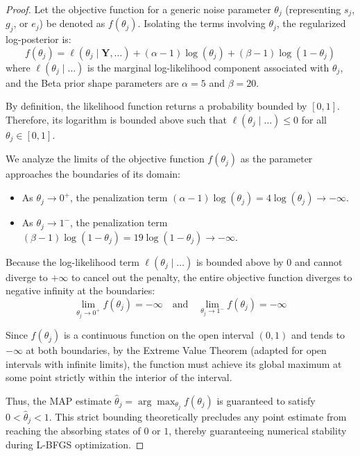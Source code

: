 \documentclass[11pt,a4paper]{article}
\begin{document}
\begin{proof}
Let the objective function for a generic noise parameter $\theta_j$ 
(representing $s_j$, $g_j$, or $e_j$) be denoted as $f(\theta_j)$. 
Isolating the terms involving $\theta_j$, the regularized log-posterior is:
\begin{equation}
    f(\theta_j) = \ell(\theta_j \mid \mathbf{Y}, \dots) 
    + (\alpha - 1)\log(\theta_j) + (\beta - 1)\log(1 - \theta_j)
\end{equation}
where $\ell(\theta_j \mid \dots)$ is the marginal log-likelihood component 
associated with $\theta_j$, and the Beta prior shape parameters are 
$\alpha = 5$ and $\beta = 20$.

By definition, the likelihood function returns a probability bounded by $[0, 1]$. 
Therefore, its logarithm is bounded above such that 
$\ell(\theta_j \mid \dots) \le 0$ for all $\theta_j \in [0, 1]$.

We analyze the limits of the objective function $f(\theta_j)$ 
as the parameter approaches the boundaries of its domain:
\begin{itemize}
    \item As $\theta_j \to 0^+$, the penalization term 
    $(\alpha - 1)\log(\theta_j) = 4\log(\theta_j) \to -\infty$.
    \item As $\theta_j \to 1^-$, the penalization term 
    $(\beta - 1)\log(1 - \theta_j) = 19\log(1 - \theta_j) \to -\infty$.
\end{itemize}

Because the log-likelihood term $\ell(\theta_j \mid \dots)$ is bounded 
above by $0$ and cannot diverge to $+\infty$ to cancel out the penalty, 
the entire objective function diverges to negative infinity at the boundaries:
\begin{equation}
    \lim_{\theta_j \to 0^+} f(\theta_j) = -\infty \quad \text{and} \quad \lim_{\theta_j \to 1^-} f(\theta_j) = -\infty
\end{equation}

Since $f(\theta_j)$ is a continuous function on the open interval $(0, 1)$ 
and tends to $-\infty$ at both boundaries, by the Extreme Value Theorem 
(adapted for open intervals with infinite limits), the function must achieve 
its global maximum at some point strictly within the interior of the interval. 

Thus, the MAP estimate $\hat{\theta}_j = \arg\max_{\theta_j} f(\theta_j)$ 
is guaranteed to satisfy $0 < \hat{\theta}_j < 1$. 
This strict bounding theoretically precludes any point estimate from reaching 
the absorbing states of $0$ or $1$, thereby guaranteeing numerical stability 
during L-BFGS optimization.
\end{proof}
\end{document}
